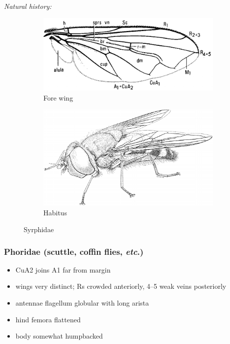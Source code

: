 \documentclass[letterpaper, 11pt]{article}
\begin{document}
\noindent{}\textit{Natural history:} \\

\begin{figure}[ht!]
    \centering
    \begin{subfigure}[ht!]{0.45\textwidth}
        \includegraphics[width=\textwidth]{SyrphidWing}
        \caption{Fore wing \citep[][Fig. 52.52]{mcalpine1981manualv2}}
        \label{fig:syrphid2}
    \end{subfigure}
    \qquad 
    \begin{subfigure}[ht!]{0.45\textwidth}
        \includegraphics[width=\textwidth]{SyrphidHabitus}
        \caption{Habitus \citep[][Fig. 52.1]{mcalpine1981manualv2}}
        \label{fig:syrpidh1}
    \end{subfigure}
    \caption{Syrphidae}\label{fig:syrphids}
\end{figure}

\subsubsection{Phoridae (scuttle, coffin flies, \textit{etc}.)}
\begin{itemize}
\item CuA2 joins A1 far from margin
\item wings very distinct; Rs crowded anteriorly, 4--5 weak veins posteriorly
\item antennae flagellum globular with long arista
\item hind femora flattened
\item body somewhat humpbacked
\end{itemize}
\end{document}
